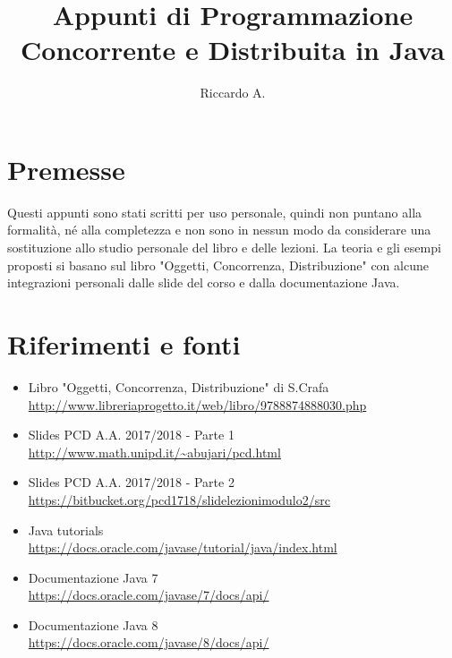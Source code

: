 

\author{Riccardo A.}
\title{Appunti di Programmazione Concorrente e Distribuita in Java}



\maketitle

\section*{Premesse}
Questi appunti sono stati scritti per uso personale, quindi non puntano alla formalità, né alla completezza e non sono in nessun modo da considerare una sostituzione allo studio personale del libro e delle lezioni. La teoria e gli esempi proposti si basano sul libro "Oggetti, Concorrenza, Distribuzione" con alcune integrazioni personali dalle slide del corso e dalla documentazione Java.

\section*{Riferimenti e fonti}
\begin{itemize}
\item Libro "Oggetti, Concorrenza, Distribuzione" di S.Crafa\\
\url{http://www.libreriaprogetto.it/web/libro/9788874888030.php}
\item Slides PCD A.A. 2017/2018 - Parte 1 \\
\url{http://www.math.unipd.it/~abujari/pcd.html}
\item Slides PCD A.A. 2017/2018 - Parte 2 \\
\url{https://bitbucket.org/pcd1718/slidelezionimodulo2/src}
\item Java tutorials \\
\url{https://docs.oracle.com/javase/tutorial/java/index.html}
\item Documentazione Java 7 \\
\url{https://docs.oracle.com/javase/7/docs/api/}
\item Documentazione Java 8 \\
\url{https://docs.oracle.com/javase/8/docs/api/}
\end{itemize}

\tableofcontents



